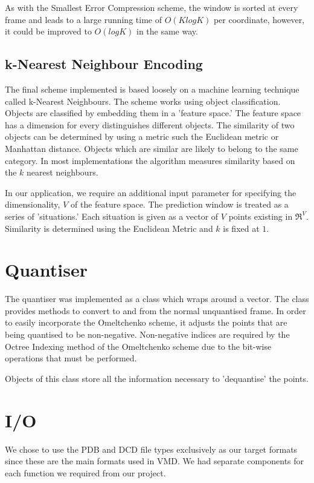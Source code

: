 \documentclass[a4paper,11pt]{report}
\begin{document}
As with the Smallest Error Compression scheme, the window is sorted at every frame and leads to a large running time of $O(KlogK)$ per coordinate, however, it could be improved to $O(logK)$ in the same way.

\subsection{k-Nearest Neighbour Encoding}

The final scheme implemented is based loosely on a machine learning technique called k-Nearest Neighbours. The scheme works using object classification. Objects are classified by embedding them in a 'feature space.' The feature space has a dimension for every distinguishes different objects. The similarity of two objects can be determined by using a metric such the Euclidean metric or Manhattan distance. Objects which are similar are likely to belong to the same category. In most implementations the algorithm measures similarity based on the $k$ nearest neighbours.

In our application, we require an additional input parameter for specifying the dimensionality, $V$ of the feature space. The prediction window is treated as a series of 'situations.' Each situation is given as a vector of $V$ points existing in $\Re^V$. Similarity is determined using the Euclidean Metric and $k$ is fixed at $1$.

\section{Quantiser}

The quantiser was implemented as a class which wraps around a vector. The class provides methods to convert to and from the normal unquantised frame. In order to easily incorporate the Omeltchenko scheme, it adjusts the points that are being quantised to be non-negative. Non-negative indices are required by the Octree Indexing method of the Omeltchenko scheme due to the bit-wise operations that must be performed.

Objects of this class store all the information necessary to 'dequantise' the points.

\section{I/O}

We chose to use the PDB and DCD file types exclusively as our target formats since these are the main formats used in VMD. We had separate components for each function we required from our project. 
\end{document}
